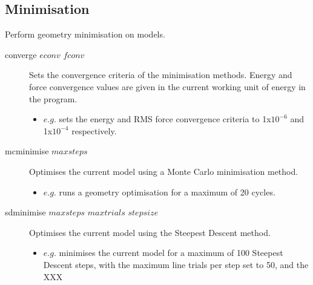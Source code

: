 \subsection{Minimisation}
Perform geometry minimisation on models.\\
\begin{description}

	\item[converge $econv$ $fconv$\its] Sets the convergence criteria of the minimisation methods. Energy and force convergence values are given in the current working unit of energy in the program.
	\begin{itemize}
		\item $e.g.$  sets the energy and RMS force convergence criteria to 1x$10^{-6}$ and 1x$10^{-4}$ respectively.
	\end{itemize}

	\item[mcminimise $maxsteps$\its] Optimises the current model using a Monte Carlo minimisation method.
	\begin{itemize}
		\item $e.g.$  runs a geometry optimisation for a maximum of 20 cycles.
	\end{itemize}

	\item[sdminimise $maxsteps$ $maxtrials$ $stepsize$\its] Optimises the current model using the Steepest Descent method.
	\begin{itemize}
		\item $e.g.$  minimises the current model for a maximum of 100 Steepest Descent steps, with the maximum line trials per step set to 50, and the XXX
	\end{itemize}

\end{description}


